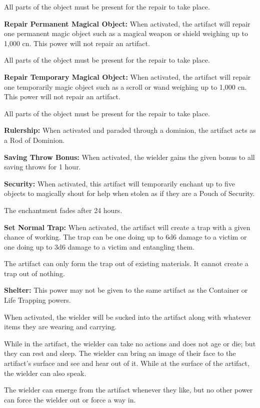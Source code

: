 \begin{multicols*}{2}
All parts of the object must be present for the repair to take place.

\textbf{Repair Permanent Magical Object:} When activated, the artifact will repair one permanent magic object such as a magical weapon or shield weighing up to 1,000 cn. This power will not repair an artifact.

All parts of the object must be present for the repair to take place.

\textbf{Repair Temporary Magical Object:} When activated, the artifact will repair one temporarily magic object such as a scroll or wand weighing up to 1,000 cn. This power will not repair an artifact.

All parts of the object must be present for the repair to take place.

\textbf{Rulership:} When activated and paraded through a dominion, the artifact acts as a Rod of Dominion.

\textbf{Saving Throw Bonus:} When activated, the wielder gains the given bonus to all saving throws for 1 hour.

\textbf{Security:} When activated, this artifact will temporarily enchant up to five objects to magically shout for help when stolen as if they are a Pouch of Security.

The enchantment fades after 24 hours.

\textbf{Set Normal Trap:} When activated, the artifact will create a trap with a given chance of working. The trap can be one doing up to 6d6 damage to a victim or one doing up to 3d6 damage to a victim and entangling them.

The artifact can only form the trap out of existing materials. It cannot create a trap out of nothing.

\textbf{Shelter:} This power may not be given to the same artifact as the Container or Life Trapping powers.

When activated, the wielder will be sucked into the artifact along with whatever items they are wearing and carrying.

While in the artifact, the wielder can take no actions and does not age or die; but they can rest and sleep. The wielder can bring an image of their face to the artifact’s surface and see and hear out of it. While at the surface of the artifact, the wielder can also speak.

The wielder can emerge from the artifact whenever they like, but no other power can force the wielder out or force a way in.


\end{multicols*}
